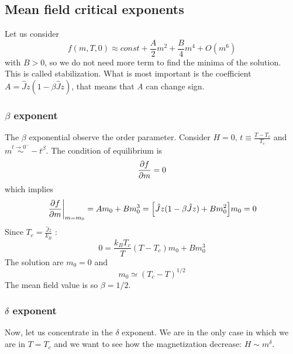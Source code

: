 \documentclass[../main/main.tex]{subfiles}
\begin{document}

\subsection{Mean field critical exponents}
Let us consider
\begin{equation}
  f (m,T,0) \approx const + \frac{A}{2} m^2 + \frac{B}{4} m^4 + O(m^6)
\end{equation}
with \( B>0 \), so we do not need more term to find the minima of the solution. This is called stabilization. What is most important is  the coefficient \( A = \hat{J} z (1- \beta \hat{J} z ) \), that means that  \emph{A} can change sign.
\subsubsection{\( \beta  \) exponent}
The \( \beta  \) exponential observe the order parameter. Consider \( H=0,\, t \equiv \frac{T-T_c}{T_c} \) and \( m \overset{t \rightarrow 0^-}{\sim } -t^ \beta  \). The condition of equilibrium is
\begin{equation}
  \pdv{f}{m}=0
\end{equation}
which implies
\begin{equation}
  \eval{\pdv{f}{m} }_{m=m_0} = A m_0 + B m_0^3 = \qty[ \hat{J} z ( 1- \beta \hat{J} z ) + B m_0^2]m_0 = 0
\end{equation}
Since \( T_c = \frac{\hat{J}z }{k_B } \) :
\begin{equation}
  0 = \frac{k_B T_c}{T} (T-T_c) m_0 + B m_0^3
\end{equation}
The solution are \( m_0=0 \) and
\begin{equation}
  m_0 \simeq (T_c-T)^{1/2}
\end{equation}
The mean field value is so \( \beta =1/2 \).

\subsubsection{\( \delta  \) exponent}
Now, let us concentrate in the \( \delta  \) exponent. We are in the only case in which we are in \( T = T_c \) and we want to see how the magnetization decrease: \(  H \sim m^ \delta \).
\end{document}

